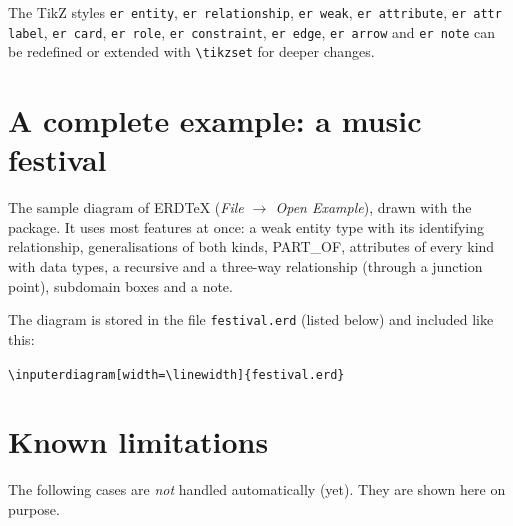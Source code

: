 \documentclass[10pt,a4paper]{article}
\newcommand\cs[1]{\texttt{\textbackslash#1}}
\begin{document}
The TikZ styles \texttt{er entity}, \texttt{er relationship},
\texttt{er weak}, \texttt{er attribute}, \texttt{er attr label},
\texttt{er card}, \texttt{er role}, \texttt{er constraint},
\texttt{er edge}, \texttt{er arrow} and \texttt{er note} can be
redefined or extended with \cs{tikzset} for deeper changes.

\section{A complete example: a music festival}

The sample diagram of ERDTeX (\emph{File $\to$ Open Example}),
drawn with the package. It uses most features at once: a weak entity type
with its identifying relationship, generalisations of both kinds, PART\_OF,
attributes of every kind with data types, a recursive and a three-way
relationship (through a junction point), subdomain boxes and a note.

The diagram is stored in the file \texttt{festival.erd} (listed below) and
included like this:

\begin{center}
\verb|\inputerdiagram[width=\linewidth]{festival.erd}|
\end{center}

\medskip
\noindent{}



\section{Known limitations}\label{sec:limits}

The following cases are \emph{not} handled automatically (yet). They are
shown here on purpose.
\end{document}
